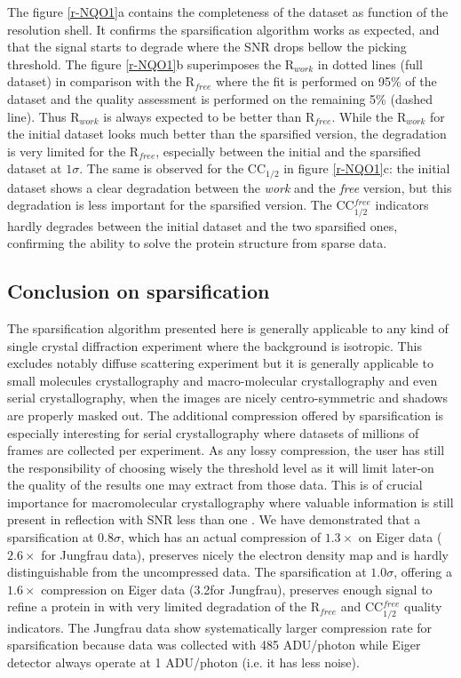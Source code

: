 \documentclass[preprint]{iucr}              %
\begin{document}
The figure \ref{r-NQO1}a contains the completeness of the dataset as function of the resolution shell. 
It confirms the sparsification algorithm works as expected, and that the signal starts to degrade where the SNR drops bellow the picking threshold. 
The figure \ref{r-NQO1}b superimposes the R$_{work}$ in dotted lines (full dataset) in comparison with the R$_{free}$ where the fit is performed on 95\% of the dataset and the quality assessment is performed on the remaining 5\% (dashed line).
Thus R$_{work}$ is always expected to be better than R$_{free}$.
While the R$_{work}$ for the initial dataset looks much better than the sparsified version, the degradation is very limited for the R$_{free}$, especially between the initial and the sparsified dataset at $1\sigma$.
The same is observed for the CC$_{1/2}$ in figure \ref{r-NQO1}c: the initial dataset shows a clear degradation between the \textit{work} and the \textit{free} version, but this degradation is less important for the sparsified version.
The CC$_{1/2}^{free}$ indicators hardly degrades between the initial dataset and the two sparsified ones, confirming the ability to solve the protein structure from sparse data.

\subsection{Conclusion on sparsification}
The sparsification algorithm presented here is generally applicable to any kind of single crystal diffraction experiment where the background is isotropic. 
This excludes notably diffuse scattering experiment but it is generally applicable to small molecules crystallography and macro-molecular crystallography and even serial crystallography, when the images are nicely centro-symmetric and shadows are properly masked out.
The additional compression offered by sparsification is especially interesting for serial crystallography where datasets of millions of frames are collected per experiment.
As any lossy compression, the user has still the responsibility of choosing wisely the threshold level as it will limit later-on the quality of the results one may extract from those data. 
This is of crucial importance for macromolecular crystallography where valuable information is still present in reflection with SNR less than one \cite{cc1/2}.
We have demonstrated that a sparsification at $0.8\sigma$, which has an actual compression of $1.3 \times$ on Eiger data ($2.6 \times$ for Jungfrau data), preserves nicely the electron density map and is hardly distinguishable from the uncompressed data.
The sparsification at $1.0\sigma$, offering a $1.6\times$ compression on Eiger data (3.2\times for Jungfrau), preserves enough signal to refine a protein in with very limited degradation of the R$_{free}$ and CC$_{1/2}^{free}$ quality indicators.
The Jungfrau data show systematically larger compression rate for sparsification because data was collected with 485 ADU/photon while Eiger detector always operate at 1 ADU/photon (i.e. it has less noise).
\end{document}
